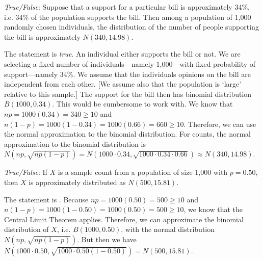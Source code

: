 \documentclass[11pt,letterpaper]{article}
\begin{document}
\quizsol \textit{True/False}: Suppose that a support for a particular bill is approximately 34\%, i.e. 34\% of the population supports the bill. Then among a population of 1,000 randomly chosen individuals, the distribution of the number of people supporting the bill is approximately $N(340, 14.98)$. \pspace

\sol The statement is \textit{true}. An individual either supports the bill or not. We are selecting a fixed number of individuals---namely 1,000---with fixed probability of support---namely 34\%. We assume that the individuals opinions on the bill are independent from each other. [We assume also that the population is `large' relative to this sample.] The support for the bill then has binomial distribution $B(1000, 0.34)$. This would be cumbersome to work with. We know that $np= 1000(0.34)= 340 \geq 10$ and $n(1 - p)= 1000(1 - 0.34)= 1000(0.66)= 660 \geq 10$. Therefore, we can use the normal approximation to the binomial distribution. For counts, the normal approximation to the binomial distribution is $N(np, \sqrt{np(1 - p)})= N(1000 \cdot 0.34, \sqrt{1000 \cdot 0.34 \cdot 0.66}) \approx N(340, 14.98)$. \pvspace{1.5cm}




\quizsol \textit{True/False}: If $X$ is a sample count from a population of size 1,000 with $p= 0.50$, then $X$ is approximately distributed as $N(500, 15.81)$. \pspace

\sol The statement is . Because $np= 1000(0.50)= 500 \geq 10$ and $n(1 - p)= 1000(1 - 0.50)= 1000 (0.50)= 500 \geq 10$, we know that the Central Limit Theorem applies. Therefore, we can approximate the binomial distribution of $X$, i.e. $B(1000,0.50)$, with the normal distribution $N(np, \sqrt{np(1 - p)})$. But then we have $N(1000 \cdot 0.50, \sqrt{1000 \cdot 0.50 (1 - 0.50)})= N(500, 15.81)$. 
\end{document}
